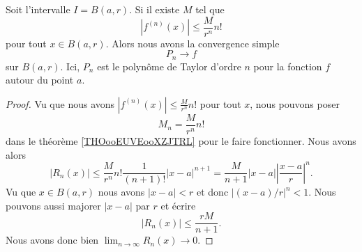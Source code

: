 \begin{proposition}
	Soit l'intervalle \( I=B(a,r)\). Si il existe \( M\) tel que
	\begin{equation}
		| f^{(n)}(x) |\leq \frac{ M }{ r^n }n!
	\end{equation}
	pour tout \( x\in B(a,r)\). Alors nous avons la convergence simple
	\begin{equation}
		P_n\to f
	\end{equation}
	sur \( B(a,r)\). Ici, \( P_n\) est le polynôme de Taylor d'ordre \( n\) pour la fonction \( f\) autour du point \( a\).
\end{proposition}

\begin{proof}
	Vu que nous avons \( | f^{(n)}(x) |\leq \frac{ M }{ r^n }n!\) pour tout \( x\), nous pouvons poser
	\begin{equation}
		M_n=\frac{ M }{ r^n }n!
	\end{equation}
	dans le théorème \ref{THOooEUVEooXZJTRL} pour le faire fonctionner. Nous avons alors
	\begin{equation}
		| R_n(x) |\leq \frac{ M }{ r^n }n!\frac{1}{ (n+1)! }| x-a |^{n+1}=\frac{ M }{ n+1 }| x-a |\left| \frac{ x-a }{ r } \right|^n.
	\end{equation}
	Vu que \( x\in B(a,r)\) nous avons \( | x-a |<r\) et donc \( |(x-a)/r |^n<1\). Nous pouvons aussi majorer \( | x-a |\) par \( r\) et écrire
	\begin{equation}
		| R_n(x) |\leq \frac{ rM }{ n+1 }.
	\end{equation}
	Nous avons donc bien \( \lim_{n\to \infty} R_n(x)\to 0\).
\end{proof}

